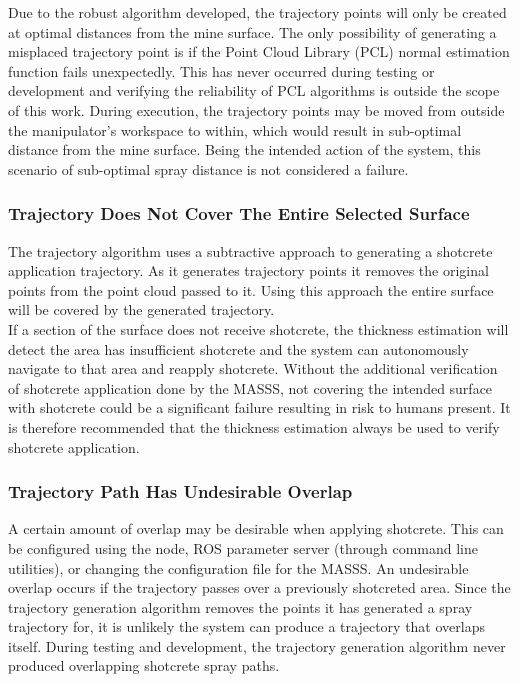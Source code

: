Due to the robust algorithm developed, the trajectory points will only be created at optimal distances from the mine surface. The only possibility of generating a misplaced trajectory point is if the Point Cloud Library (PCL) normal estimation function fails unexpectedly. This has never occurred during testing or development and verifying the reliability of PCL algorithms is outside the scope of this work. During execution, the trajectory points may be moved from outside the manipulator's workspace to within, which would result in sub-optimal distance from the mine surface. Being the intended action of the system, this scenario of sub-optimal spray distance is not considered a failure.\\

\subsubsection{Trajectory Does Not Cover The Entire Selected Surface}

The trajectory algorithm uses a subtractive approach to generating a shotcrete application trajectory. As it generates trajectory points it removes the original points from the point cloud passed to it. Using this approach the entire surface will be covered by the generated trajectory.\\

If a section of the surface does not receive shotcrete, the thickness estimation will detect the area has insufficient shotcrete and the system can autonomously navigate to that area and reapply shotcrete. Without the additional verification of shotcrete application done by the MASSS, not covering the intended surface with shotcrete could be a significant failure resulting in risk to humans present. It is therefore recommended that the thickness estimation always be used to verify shotcrete application.\\

\subsubsection{Trajectory Path Has Undesirable Overlap}

A certain amount of overlap may be desirable when applying shotcrete. This can be configured using the  node, ROS parameter server (through command line utilities), or changing the configuration file for the MASSS. An undesirable overlap occurs if the trajectory passes over a previously shotcreted area. Since the trajectory generation algorithm removes the points it has generated a spray trajectory for, it is unlikely the system can produce a trajectory that overlaps itself. During testing and development, the trajectory generation algorithm never produced overlapping shotcrete spray paths.\\

